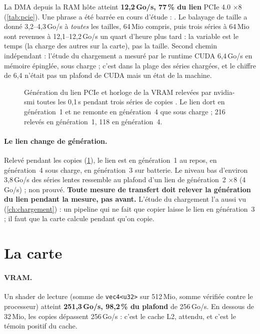 La DMA depuis la RAM hôte atteint \textbf{12,2\,Go/s, 77\,\% du lien} PCIe 4.0 $\times$8 (\cref{tab:pcie}). Une phrase a été barrée en cours d'étude : . Le balayage de taille a donné 3,2--4,3\,Go/s à \emph{toutes} les tailles, 64\,Mio compris, puis trois séries à 64\,Mio sont revenues à 12,1--12,2\,Go/s un quart d'heure plus tard : la variable est le temps (la charge des autres sur la carte), pas la taille. Second chemin indépendant : l'étude du chargement a mesuré par le runtime CUDA 6,4\,Go/s en mémoire épinglée, sous charge ; c'est dans la plage des séries chargées, et le chiffre de 6,4 n'était pas un plafond de CUDA mais un état de la machine.

\begin{figure}[ht]
\centering
\GraphePCIe
\caption[Génération du lien PCIe pendant des copies]{Génération du lien PCIe et horloge de la VRAM relevées par nvidia-smi toutes les 0,1\,s pendant trois séries de copies \mes. Le lien dort en génération~1 et ne remonte en génération~4 que sous charge ; 216 relevés en génération~1, 118 en génération~4.}
\label{fig:pcie-gen}
\end{figure}

\paragraph{Le lien change de génération.} Relevé pendant les copies (\cref{fig:pcie-gen}), le lien est en génération~1 au repos, en génération~4 sous charge, en génération~3 sur batterie. Le niveau bas d'environ 3,8\,Go/s des séries lentes ressemble au plafond d'un lien de génération~2 $\times$8 (4\,Go/s) ; non prouvé. \textbf{Toute mesure de transfert doit relever la génération du lien pendant la mesure, pas avant.} L'étude du chargement l'a aussi vu (\cref{ch:chargement}) : un pipeline qui ne fait que copier laisse le lien en génération~3 ; il faut que la carte calcule pendant qu'on copie.

\section{La carte}\label{sec:carte}

\paragraph{VRAM.} Un shader de lecture (somme de \texttt{vec4<u32>} sur 512\,Mio, somme vérifiée contre le processeur) atteint \textbf{251,3\,Go/s, 98,2\,\% du plafond} de 256\,Go/s. En dessous de 32\,Mio, les copies dépassent 256\,Go/s : c'est le cache L2, attendu, et c'est le témoin positif du cache.


